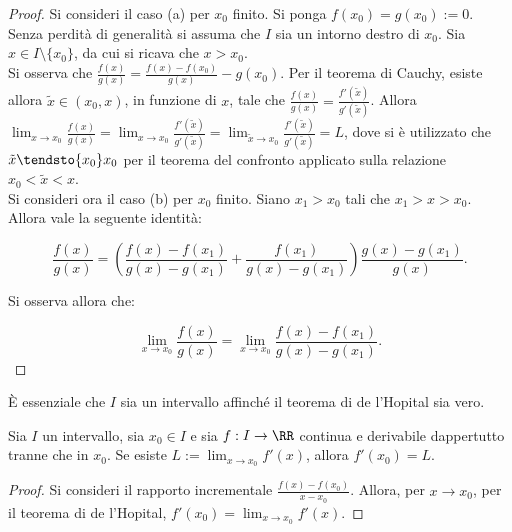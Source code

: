 \documentclass[11pt]{article}
\begin{document}
	\begin{proof}
		Si consideri il caso (a) per $x_0$ finito. Si ponga $f(x_0) = g(x_0) := 0$. Senza perdità di generalità si
		assuma che $I$ sia un intorno destro di $x_0$. Sia $x \in I \setminus \{x_0\}$, da cui si ricava che $x > x_0$. \\
		
		Si osserva che $\frac{f(x)}{g(x)} = \frac{f(x) - f(x_0)}{g(x)} - g(x_0)$. Per il teorema di Cauchy, esiste allora $\tilde{x} \in (x_0, x)$,
		in funzione di $x$, tale
		che $\frac{f(x)}{g(x)} = \frac{f'(\tilde x)}{g'(\tilde x)}$. Allora
		$\lim_{x \to x_0} \frac{f(x)}{g(x)} = \lim_{x \to x_0} \frac{f'(\tilde x)}{g'(\tilde x)} = \lim_{\tilde x \to x_0} \frac{f'(\tilde x)}{g'(\tilde x)} = L$, dove si è utilizzato che $\tilde x \tendsto{x_0} x_0$ per il teorema del confronto applicato sulla
		relazione $x_0 < \tilde x < x$. \\
		
		Si consideri ora il caso (b) per $x_0$ finito. Siano $x_1 > x_0$
		tali che $x_1 > x > x_0$. Allora vale la seguente identità:
		
		\[ \frac{f(x)}{g(x)} = \left( \frac{f(x) - f(x_1)}{g(x) - g(x_1)} + \frac{f(x_1)}{g(x) - g(x_1)} \right) \frac{g(x) - g(x_1)}{g(x)}. \]
		
		Si osserva allora che:
		
		\[ \lim_{x \to x_0} \frac{f(x)}{g(x)} = \lim_{x \to x_0} \frac{f(x) - f(x_1)}{g(x) - g(x_1)}. \]
	\end{proof}

	\begin{remark}
		È essenziale che $I$ sia un intervallo affinché il teorema di de
		l'Hopital sia vero.
	\end{remark}

	\begin{proposition}
		Sia $I$ un intervallo, sia $x_0 \in I$ e sia $f : I \to \RR$ continua
		e derivabile dappertutto tranne che in $x_0$. Se esiste
		$L := \lim_{x \to x_0} f'(x)$, allora $f'(x_0) = L$.
	\end{proposition}

	\begin{proof}
		Si consideri il rapporto incrementale $\frac{f(x) - f(x_0)}{x - x_0}$.
		Allora, per $x \to x_0$, per il teorema di de l'Hopital, $f'(x_0) = \lim_{x \to x_0} f'(x)$.
	\end{proof}
\end{document}
